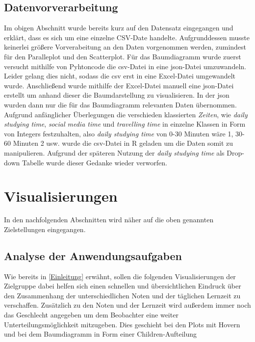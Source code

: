 \documentclass[usegeometry=true]{scrartcl}
\begin{document}
\subsection{Datenvorverarbeitung}\label{Datenvorverarbeitung}
Im obigen Abschnitt wurde bereits kurz auf den Datensatz eingegangen und erklärt, dass es sich um eine einzelne CSV-Date handelte. Aufgrunddessen musste keinerlei größere Vorverabeitung an den Daten vorgenommen werden, zumindest für den Paralleplot und den Scatterplot. Für das Baumdiagramm wurde zuerst versucht mithilfe von Pyhtoncode die csv-Datei in eine json-Datei umzuwandeln. Leider gelang dies nicht, sodass die csv erst in eine Excel-Datei umgewandelt wurde. Anschließend wurde mithilfe der Excel-Datei manuell eine json-Datei erstellt um anhand dieser die Baumdarstellung zu visualisieren. In der json wurden dann nur die für das Baumdiagramm relevanten Daten übernommen. Aufgrund anfänglicher Überlegungen die verschieden klassierten \textit{Zeiten}, wie \textit{daily studying time}, \textit{social media time} und \textit{travelling time} in einzelne Klassen in Form von Integers festzuhalten, also \textit{daily studying time} von 0-30 Minuten wäre 1, 30-60 Minuten 2 usw. wurde die csv-Datei in R geladen um die Daten somit zu manipulieren. Aufgrund der späteren Nutzung der \textit{daily studying time} als Drop-down Tabelle wurde dieser Gedanke wieder verworfen.
\\

\section{Visualisierungen}
In den nachfolgenden Abschnitten wird näher auf die oben genannten Zielstellungen eingegangen.
\subsection{Analyse der Anwendungsaufgaben}
Wie bereits in \ref{Einleitung} erwähnt, sollen die folgenden Visualisierungen der Zielgruppe dabei helfen sich einen schnellen und übersichtlichen Eindruck über den Zusammenhang der unterschiedlichen Noten und der täglichen Lernzeit zu verschaffen. Zusätzlich zu den Noten und der Lernzeit wird außerdem immer noch das Geschlecht angegeben um dem Beobachter eine weiter Unterteilungsmöglichkeit mitzugeben. Dies geschieht bei den Plots mit Hovern und bei dem Baumdiagramm in Form einer Children-Aufteilung
\end{document}

